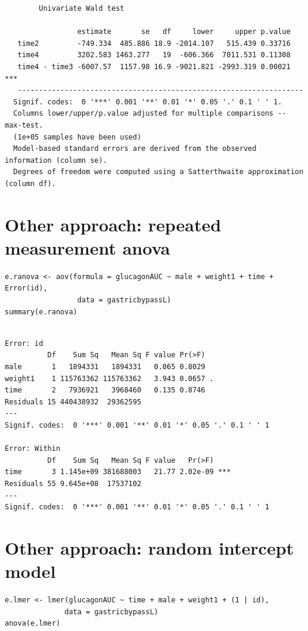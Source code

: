 \documentclass[12pt]{article}
\begin{document}
\begin{verbatim}
		Univariate Wald test 

                 estimate       se   df     lower     upper p.value    
   time2         -749.334  485.886 18.9 -2014.107   515.439 0.33716    
   time4         3202.583 1463.277   19  -606.366  7011.531 0.11308    
   time4 - time3 -6007.57  1157.98 16.9 -9021.821 -2993.319 0.00021 ***
   ------------------------------------------------------------------- 
  Signif. codes:  0 '***' 0.001 '**' 0.01 '*' 0.05 '.' 0.1 ' ' 1.
  Columns lower/upper/p.value adjusted for multiple comparisons -- max-test.
  (1e+05 samples have been used)
  Model-based standard errors are derived from the observed information (column se). 
  Degrees of freedom were computed using a Satterthwaite approximation (column df).
\end{verbatim}

\clearpage

\section{Other approach: repeated measurement anova}
\label{sec:orgfeb7cfa}

\lstset{language=r,label= ,caption= ,captionpos=b,numbers=none}
\begin{lstlisting}
e.ranova <- aov(formula = glucagonAUC ~ male + weight1 + time + Error(id),
                 data = gastricbypassL)
summary(e.ranova)
\end{lstlisting}

\begin{verbatim}

Error: id
          Df    Sum Sq   Mean Sq F value Pr(>F)  
male       1   1894331   1894331   0.065 0.8029  
weight1    1 115763362 115763362   3.943 0.0657 .
time       2   7936921   3968460   0.135 0.8746  
Residuals 15 440438932  29362595                 
---
Signif. codes:  0 '***' 0.001 '**' 0.01 '*' 0.05 '.' 0.1 ' ' 1

Error: Within
          Df    Sum Sq   Mean Sq F value   Pr(>F)    
time       3 1.145e+09 381688003   21.77 2.02e-09 ***
Residuals 55 9.645e+08  17537102                     
---
Signif. codes:  0 '***' 0.001 '**' 0.01 '*' 0.05 '.' 0.1 ' ' 1
\end{verbatim}


\clearpage

\section{Other approach: random intercept model}
\label{sec:org15e3612}
\lstset{language=r,label= ,caption= ,captionpos=b,numbers=none}
\begin{lstlisting}
e.lmer <- lmer(glucagonAUC ~ time + male + weight1 + (1 | id),
              data = gastricbypassL)
anova(e.lmer)
\end{lstlisting}
\end{document}
